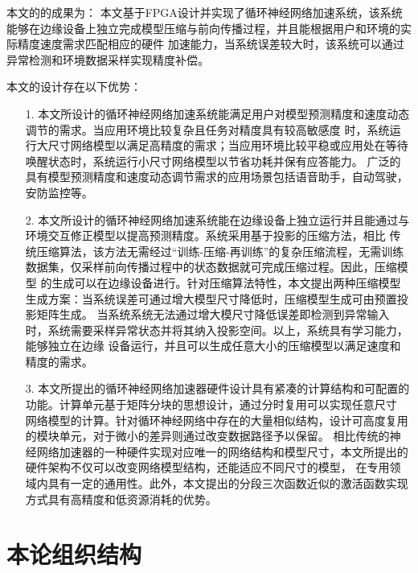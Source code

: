 本文的的成果为： 本文基于FPGA设计并实现了循环神经网络加速系统，该系统能够在边缘设备上独立完成模型压缩与前向传播过程，并且能根据用户和环境的实际精度速度需求匹配相应的硬件
加速能力，当系统误差较大时，该系统可以通过异常检测和环境数据采样实现精度补偿。

本文的设计存在以下优势：

\begin{itemize}
\vspace{4pt}
\item[1.]本文所设计的循环神经网络加速系统能满足用户对模型预测精度和速度动态调节的需求。当应用环境比较复杂且任务对精度具有较高敏感度
时，系统运行大尺寸网络模型以满足高精度的需求；当应用环境比较平稳或应用处在等待唤醒状态时，系统运行小尺寸网络模型以节省功耗并保有应答能力。
广泛的具有模型预测精度和速度动态调节需求的应用场景包括语音助手，自动驾驶，安防监控等。　

\vspace{4pt}
\item[2.]本文所设计的循环神经网络加速系统能在边缘设备上独立运行并且能通过与环境交互修正模型以提高预测精度。系统采用基于投影的压缩方法，相比
传统压缩算法，该方法无需经过“训练-压缩-再训练”的复杂压缩流程，无需训练数据集，仅采样前向传播过程中的状态数据就可完成压缩过程。因此，压缩模型
的生成可以在边缘设备进行。针对压缩算法特性，本文提出两种压缩模型生成方案：当系统误差可通过增大模型尺寸降低时，压缩模型生成可由预置投影矩阵生成。
当系统系统无法通过增大模尺寸降低误差即检测到异常输入时，系统需要采样异常状态并将其纳入投影空间。以上，系统具有学习能力，能够独立在边缘
设备运行，并且可以生成任意大小的压缩模型以满足速度和精度的需求。

\vspace{4pt}
\item[3.]本文所提出的循环神经网络加速器硬件设计具有紧凑的计算结构和可配置的功能。计算单元基于矩阵分块的思想设计，通过分时复用可以实现任意尺寸
网络模型的计算。针对循环神经网络中存在的大量相似结构，设计可高度复用的模块单元，对于微小的差异则通过改变数据路径予以保留。
相比传统的神经网络加速器的一种硬件实现对应唯一的网络结构和模型尺寸，本文所提出的硬件架构不仅可以改变网络模型结构，还能适应不同尺寸的模型，
在专用领域内具有一定的通用性。此外，本文提出的分段三次函数近似的激活函数实现方式具有高精度和低资源消耗的优势。
\vspace{4pt}
\end{itemize}

\section{本论组织结构}

